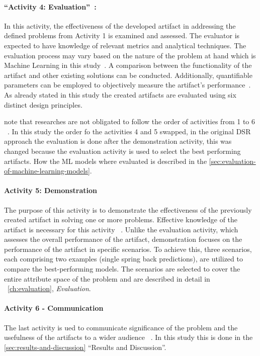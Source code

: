 \paragraph{``Activity 4: Evaluation''~\cite[p. 56]{peffers_designscienceresearch_2007}:}
In this activity, the effectiveness of the developed artifact in addressing the defined problems from Activity 1 is
examined and assessed.
The evaluator is expected to have knowledge of relevant metrics and analytical techniques.
The evaluation process may vary based on the nature of the problem at hand which is Machine Learning in this
study~\cite[p. 56]{peffers_designscienceresearch_2007}.
A comparison between the functionality of the artifact and other existing solutions can be conducted.
Additionally, quantifiable parameters can be employed to objectively measure the artifact's
performance~\cite[p. 56]{peffers_designscienceresearch_2007}.
As already stated in this study the created artifacts are evaluated using six distinct design principles.

\cite{peffers_designscienceresearch_2007} note that researches are not obligated to follow the order of activities
from 1 to 6
~\cite[p. 56]{peffers_designscienceresearch_2007}.
In this study the order fo the activities 4 and 5 swapped, in the original DSR approach the evaluation is done after
the demonstration activity, this was changed because the evaluation activity is used to select the best performing
artifacts.
How the \ac{ML} models where evaluated is described in the \cref{sec:evaluation-of-machine-learning-models}.


\paragraph{Activity 5: Demonstration}
The purpose of this activity is to demonstrate the effectiveness of the previously created artifact in solving one or
more problems.
Effective knowledge of the artifact is necessary for this activity
~\cite[p. 55]{peffers_designscienceresearch_2007}.
Unlike the evaluation activity, which assesses the overall performance of the artifact, demonstration focuses on the
performance of the artifact in specific scenarios.
To achieve this, three scenarios, each comprising two examples (single spring back predictions), are utilized to
compare the best-performing models.
The scenarios are selected to cover the entire attribute space of the problem and are described in detail in
~\cref{ch:evaluation}, \textit{Evaluation}.

\paragraph{Activity 6 - Communication}
The last activity is ued to communicate significance of the problem and the usefulness of the artifacts to a wider
audience
~\cite[p. 56]{peffers_designscienceresearch_2007}.
In this study this is done in the \cref{sec:results-and-discussion} ``Results and Discussion''.


